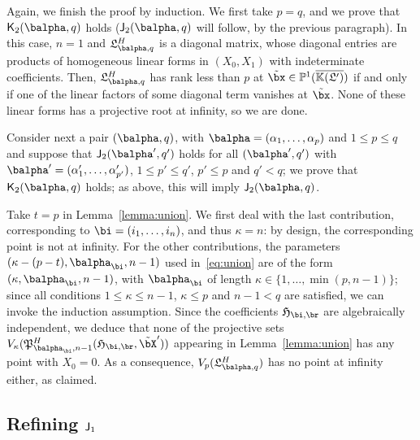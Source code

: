 \documentclass[12pt]{article}
\newtheorem{lemma}[definition]{Lemma}
\begin{document}
Again, we finish the proof by induction. We first take $p=q$, and we
prove that $\assJ_2(\balpha,q)$ holds ($\assI_2(\balpha,q)$ will follow,
by the previous paragraph). In this case, $n=1$ and
$\mathfrak{L}^H_{\balpha,q}$ is a diagonal matrix, whose diagonal entries
are products of homogeneous linear forms in $(X_0,X_1)$ with indeterminate
coefficients. Then, $\mathfrak{L}^H_{\balpha,q}$ has rank less than $p$ at
$\tilde\bx\in\P^1(\KKGpbar)$ if and only if one of the linear factors
of some diagonal term vanishes at $\tilde \bx$. None of these linear
forms has a projective root at infinity, so we are done.

Consider next a pair $(\balpha,q)$, with
$\balpha=(\alpha_1,\dots,\alpha_p)$ and $1 \le p \le q$ and suppose
that $\assI_2(\balpha',q')$ holds for all $(\balpha',q')$ with
$\balpha'=(\alpha'_1,\dots,\alpha'_{p'})$, $1 \le p' \le q'$, $p' \le p$ and $q'
< q$; we prove that $\assJ_2(\balpha,q)$ holds; as above, this will
imply $\assI_2(\balpha,q)$.

Take $t=p$ in Lemma~\ref{lemma:union}. We first deal with the last
contribution, corresponding to $\bi=(i_1,\dots,i_n)$, and thus
$\kappa=n$: by design, the corresponding point is not at infinity. For
the other contributions, the parameters $(\kappa-(p-t),\balpha_\bi,n-1)$
used in~\eqref{eq:union} are of the form $(\kappa,\balpha_\bi,n-1)$, with
$\balpha_\bi$ of length $\kappa \in \{1,\dots, \min(p,n-1)\}$; since all
conditions $1 \le \kappa \le n-1$, $\kappa \le p$ and $n-1 < q$ are satisfied,
we can invoke the induction assumption. Since the coefficients
$\mathfrak{H}_{\bi,\br}$ are algebraically independent, we deduce that
none of the projective sets
$V_\kappa(\mathfrak{P}^H_{\balpha_\bi,n-1}(\mathfrak{H}_{\bi,\br},\tilde\bX'))$ appearing in
Lemma~\ref{lemma:union} has any point with $X_0=0$. As a consequence,
$V_p(\mathfrak{L}^H_{\balpha,q})$ has no point at infinity either, as
claimed.


\subsection{Refining $\mathsf{J}_1$} 

\end{document}
